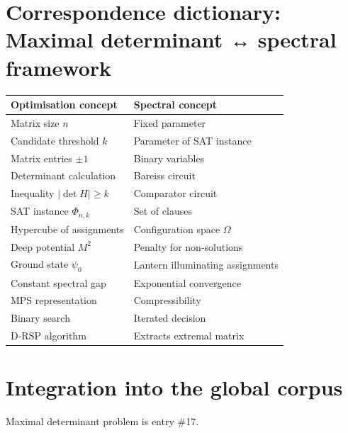 \documentclass[11pt,a4paper]{article}
\begin{document}
\section{Correspondence dictionary: Maximal determinant ↔ spectral framework}

\begin{center}
\small
\begin{tabular}{@{}l|l@{}}
\toprule
\textbf{Optimisation concept} & \textbf{Spectral concept} \\
\midrule
Matrix size $n$ & Fixed parameter \\
Candidate threshold $k$ & Parameter of SAT instance \\
Matrix entries $\pm1$ & Binary variables \\
Determinant calculation & Bareiss circuit \\
Inequality $|\det H| \ge k$ & Comparator circuit \\
SAT instance $\Phi_{n,k}$ & Set of clauses \\
Hypercube of assignments & Configuration space $\Omega$ \\
Deep potential $M^2$ & Penalty for non‑solutions \\
Ground state $\psi_0$ & Lantern illuminating assignments \\
Constant spectral gap & Exponential convergence \\
MPS representation & Compressibility \\
Binary search & Iterated decision \\
D‑RSP algorithm & Extracts extremal matrix \\
\bottomrule
\end{tabular}
\end{center}

\section{Integration into the global corpus}

Maximal determinant problem is entry \#17.
\end{document}
